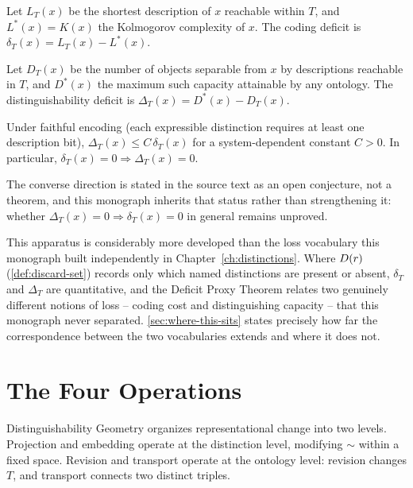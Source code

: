 \begin{definition}
\label{def:coding-deficit}
Let $L_T(x)$ be the shortest description of $x$ reachable within $T$, and
$L^*(x) = K(x)$ the Kolmogorov complexity of $x$. The coding deficit is
$\delta_T(x) = L_T(x) - L^*(x)$.
\end{definition}

\begin{definition}
\label{def:distinguishability-deficit}
Let $D_T(x)$ be the number of objects separable from $x$ by descriptions
reachable in $T$, and $D^*(x)$ the maximum such capacity attainable by any
ontology. The distinguishability deficit is $\Delta_T(x) = D^*(x) - D_T(x)$.
\end{definition}

\begin{theorem}
\label{thm:deficit-proxy}
Under faithful encoding (each expressible distinction requires at least one
description bit), $\Delta_T(x) \le C\,\delta_T(x)$ for a system-dependent
constant $C > 0$. In particular, $\delta_T(x) = 0 \Rightarrow \Delta_T(x) = 0$.
\end{theorem}

The converse direction is stated in the source text as an open conjecture,
not a theorem, and this monograph inherits that status rather than
strengthening it: whether $\Delta_T(x) = 0 \Rightarrow \delta_T(x) = 0$ in
general remains unproved.

This apparatus is considerably more developed than the loss vocabulary this
monograph built independently in Chapter~\ref{ch:distinctions}. Where
$D(r)$ (\cref{def:discard-set}) records only which named distinctions
are present or absent, $\delta_T$ and $\Delta_T$ are quantitative, and the
Deficit Proxy Theorem relates two genuinely different notions of loss --
coding cost and distinguishing capacity -- that this monograph never
separated. \cref{sec:where-this-sits} states precisely how far the
correspondence between the two vocabularies extends and where it does not.

\section{The Four Operations}
\label{sec:four-operations}


Distinguishability Geometry organizes representational change into two
levels. Projection and embedding operate at the distinction level, modifying
$\sim$ within a fixed space. Revision and transport operate at the ontology
level: revision changes $T$, and transport connects two distinct triples.

